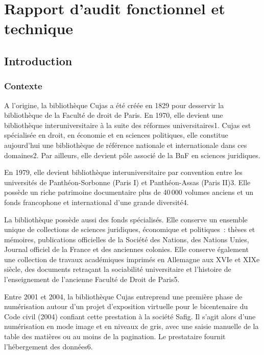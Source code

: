 \chapter{Rapport d'audit fonctionnel et technique}

\section*{Introduction}

\subsection*{Contexte} 
A l’origine, la bibliothèque Cujas a été créée en 1829 pour desservir la bibliothèque de la Faculté de droit de Paris. En 1970, elle devient une bibliothèque interuniversitaire à la suite des réformes universitaires1. Cujas est spécialisée en droit, en économie et en sciences politiques, elle constitue aujourd’hui une bibliothèque de référence nationale et internationale dans ces domaines2. Par ailleurs, elle devient pôle associé de la BnF en sciences juridiques. 

En 1979, elle devient bibliothèque interuniversitaire par convention entre les universités de Panthéon-Sorbonne (Paris I) et Panthéon-Assas (Paris II)3. Elle possède un riche patrimoine documentaire plus de 40 000 volumes anciens et un fonds francophone et international d’une grande diversité4. 

La bibliothèque possède aussi des fonds spécialisés. Elle conserve un ensemble unique de collections de sciences juridiques, économique et politiques  : thèses et mémoires, publications officielles de la Société des Nations, des Nations Unies, Journal officiel de la France et des anciennes colonies. Elle conserve également une collection de travaux académiques imprimés en Allemagne aux XVIe et XIXe siècle, des documents retraçant la sociabilité universitaire et l’histoire de l’enseignement de l’ancienne Faculté de Droit de Paris5. 

Entre 2001 et 2004, la bibliothèque Cujas entreprend une première phase de numérisation autour d’un projet d’exposition virtuelle pour le bicentenaire du Code civil (2004) confiant cette prestation à la société Safig. Il s’agit alors d’une numérisation en mode image et en niveaux de gris, avec une saisie manuelle de la table des matières ou au moins de la pagination. Le prestataire fournit l’hébergement des données6. 



